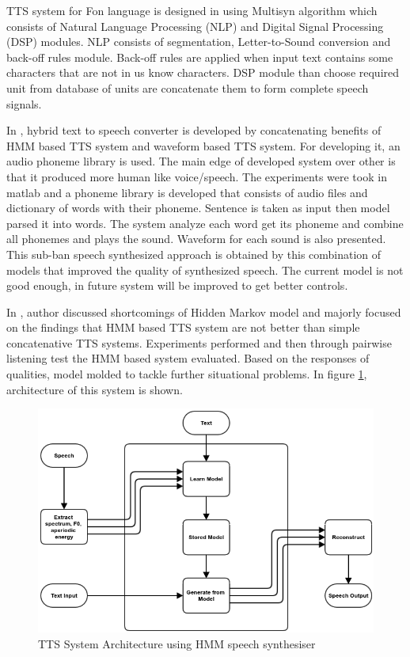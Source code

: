 TTS system for Fon language is designed in \cite{dagba2014text} using Multisyn algorithm \cite{clark2007multisyn}
which consists of Natural Language Processing (NLP) and Digital Signal Processing (DSP)
modules. NLP consists of segmentation, Letter-to-Sound conversion and back-off rules module.
Back-off rules are applied when input text contains some characters that are not in us know
characters. DSP module than choose required unit from database of units are concatenate them to
form complete speech signals.

In \cite{ganai2016text}, hybrid text to speech converter is developed by
concatenating benefits of HMM based TTS system and waveform based TTS system. For developing it, an audio phoneme library is used. The main
edge of developed system over other is that it produced more human like voice/speech. The experiments were took in
matlab and a phoneme library is developed that consists of audio files and dictionary of words with their phoneme. Sentence is
taken as input then model parsed it into words. The system analyze each word get its phoneme and combine all phonemes
and plays the sound. Waveform for each sound is also presented. This sub-ban speech synthesized approach is obtained by
this combination of models that improved the quality of synthesized speech. The current model is not good enough, in future
system will be improved to get better controls.

In \cite{merritt2013investigating}, author discussed shortcomings of Hidden Markov model and majorly focused on the findings that HMM based TTS system are not better than simple concatenative TTS systems. Experiments performed and then through pairwise listening test the HMM based system evaluated. Based on the responses of qualities, model molded to tackle further situational problems. In figure \ref{fig:Merritt_tts}, architecture of this system is shown.
\begin{center}
	\begin{figure}[hbtp]
		\centering
		\includegraphics[width=\linewidth]{images/Merritt_tts.png}
		\caption{TTS System Architecture using HMM speech synthesiser}
		\label{fig:Merritt_tts}
	\end{figure}
\end{center}

